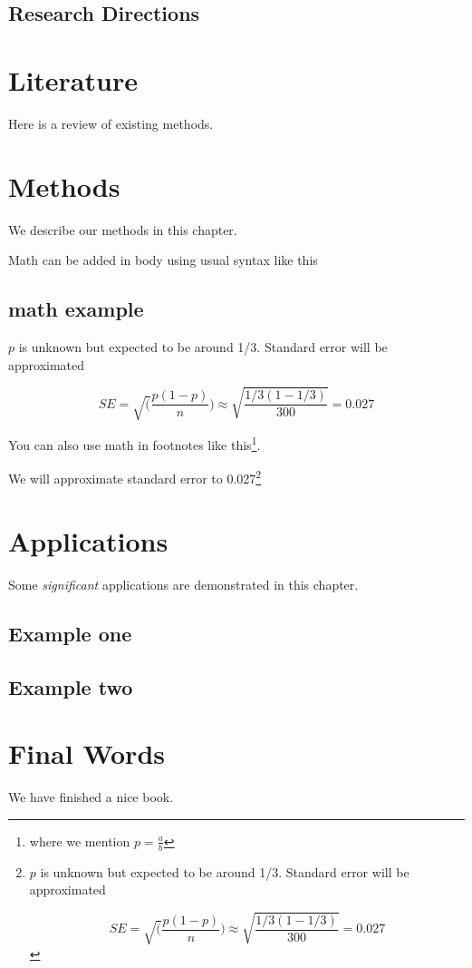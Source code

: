 \documentclass[
]{book}
\begin{document}
\hypertarget{research-directions}{%
\section*{Research Directions}\label{research-directions}}

\hypertarget{literature}{%
\chapter{Literature}\label{literature}}

Here is a review of existing methods.

\hypertarget{methods}{%
\chapter{Methods}\label{methods}}

We describe our methods in this chapter.

Math can be added in body using usual syntax like this

\hypertarget{math-example}{%
\section{math example}\label{math-example}}

\(p\) is unknown but expected to be around 1/3. Standard error will be approximated

\[
SE = \sqrt(\frac{p(1-p)}{n}) \approx \sqrt{\frac{1/3 (1 - 1/3)} {300}} = 0.027
\]

You can also use math in footnotes like this\footnote{where we mention \(p = \frac{a}{b}\)}.

We will approximate standard error to 0.027\footnote{\(p\) is unknown but expected to be around 1/3. Standard error will be approximated

  \[
  SE = \sqrt(\frac{p(1-p)}{n}) \approx \sqrt{\frac{1/3 (1 - 1/3)} {300}} = 0.027
  \]}

\hypertarget{applications}{%
\chapter{Applications}\label{applications}}

Some \emph{significant} applications are demonstrated in this chapter.

\hypertarget{example-one}{%
\section{Example one}\label{example-one}}

\hypertarget{example-two}{%
\section{Example two}\label{example-two}}

\hypertarget{final-words}{%
\chapter{Final Words}\label{final-words}}

We have finished a nice book.

  
\end{document}
